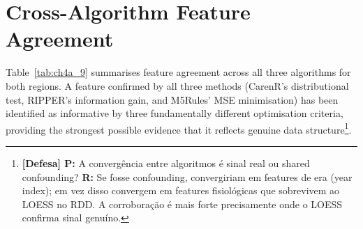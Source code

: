 \section{Cross-Algorithm Feature Agreement}\label{sec:crossalgorithm_feature_agreement}

Table~\ref{tab:ch4a_9} summarises feature agreement across all three algorithms for both regions. A feature confirmed by all three methods (CarenR's distributional test, RIPPER's information gain, and M5Rules' MSE minimisation) has been identified as informative by three fundamentally different optimisation criteria, providing the strongest possible evidence that it reflects genuine data structure\footnote{\textbf{[Defesa] P:} A convergência entre algoritmos é sinal real ou shared confounding? \textbf{R:} Se fosse confounding, convergiriam em features de era (year index); em vez disso convergem em features fisiológicas que sobrevivem ao LOESS no RDD. A corroboração é mais forte precisamente onde o LOESS confirma sinal genuíno.}.

